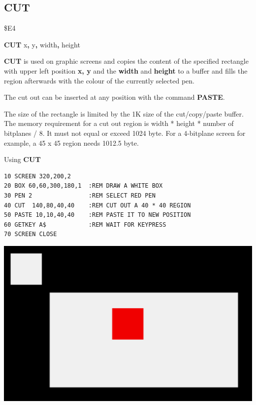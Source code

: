 \subsection{CUT}
\begin{description}[leftmargin=2cm,style=nextline]
\item [Token:] \$E4
\item [Format:] {\bf CUT} x{\bf,} y{\bf,} width{\bf,} height
\item [Usage:] {\bf CUT} is used on graphic screens and copies the content
               of the specified rectangle
               with upper left position {\bf x, y} and the {\bf width}
               and {\bf height} to a buffer and fills the region
               afterwards with the colour of the currently selected pen.

               The cut out can be inserted at any position with the
               command {\bf PASTE}.

\item [Remarks:] The size of the rectangle is limited by the 1K size of
                 the cut/copy/paste buffer. The memory requirement for
                 a cut out region is width * height * number of bitplanes / 8.
                 It must not equal or exceed 1024 byte.
                 For a 4-bitplane screen for example, a 45 x 45 region
                 needs 1012.5 byte.

\item [Example:] Using {\bf CUT}
\begin{tcolorbox}[colback=black,coltext=white]
\verbatimfont{\codefont}
\begin{verbatim}
10 SCREEN 320,200,2
20 BOX 60,60,300,180,1  :REM DRAW A WHITE BOX
30 PEN 2                :REM SELECT RED PEN
40 CUT  140,80,40,40    :REM CUT OUT A 40 * 40 REGION
50 PASTE 10,10,40,40    :REM PASTE IT TO NEW POSITION
60 GETKEY A$            :REM WAIT FOR KEYPRESS
70 SCREEN CLOSE
\end{verbatim}
\end{tcolorbox}
\item \begin{center}\includegraphics[width=0.7\linewidth]{images/cut.png}\end{center}
\end{description}

